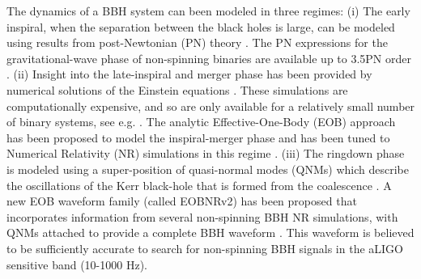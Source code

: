 \documentclass[aps,
prd,
amsmath,
amssymb,
twocolumn,
floatfix,
groupedaddress]{revtex4-1}
\begin{document}
The dynamics of a BBH system can been modeled in three regimes: (i) The early inspiral, when the separation between the black holes is large, can be modeled using results from post-Newtonian (PN) theory \citep{PNtheoryLivingReviewBlanchet}. The PN expressions for the gravitational-wave phase of non-spinning binaries are available up to 3.5PN order \citep{PNFluxEnergy3PN01,PNFluxEnergy3PN02,Jaranowski:1999qd,Jaranowski:1999ye,Damour:2001bu,KidderPN,Blanchet3PN}. (ii) Insight into the late-inspiral and merger phase has been provided by numerical solutions of the Einstein equations \citep{Pretorius2005,Pretorius2006,BBHNRScheel,BBHNRGonzalezq10,BBHNRPollney,BBHNRLoustoq10,Buchman:2012dw}. These simulations are computationally expensive, and so are only available for a relatively small number of binary systems, see e.g. \citep{Ajith:2012tt}. The analytic Effective-One-Body (EOB) approach \citep{EOBOriginalBuonannoDamour} has been proposed to model the inspiral-merger phase and has been tuned to Numerical 
Relativity (NR) simulations in this regime \citep{EOBNR01,EOBNRdevel01,EOBNRdevel02,EOBNRdevel03,EOBNRdevel04,EOBdevel01,EOBdevel02,BuonannoEOBv2Main}. (iii) The ringdown phase is modeled using a super-position of quasi-normal modes (QNMs) which describe the oscillations of the Kerr black-hole that is formed from the coalescence \citep{BHRDQNMs,BHPTMinoSasaki}. A new EOB waveform family (called EOBNRv2) has been proposed that incorporates information from several non-spinning BBH NR simulations, with QNMs attached to provide a complete BBH waveform \citep{BuonannoEOBv2Main}. This waveform is believed to be sufficiently accurate to search for non-spinning BBH signals in the aLIGO sensitive band (10-1000 Hz).
\end{document}
